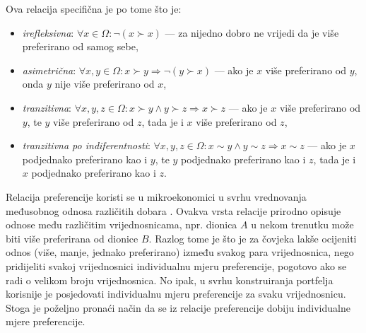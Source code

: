\documentclass[lmodern, utf8, diplomski, numeric]{fer}
\newcommand{\q}{\left}
\newcommand{\w}{\right}
\begin{document}
  Ova relacija specifična je po tome što je:
  \begin{itemize}
    \item \textit{irefleksivna}: $\forall x \in \Omega\colon \neg \q( x \succ x \w)$ --- za nijedno dobro ne vrijedi da je više preferirano od samog sebe,
    \item \textit{asimetrična}: $\forall x, y \in \Omega\colon x \succ y \Rightarrow \neg \q( y \succ x \w)$ --- ako je $x$ više preferirano od $y$, onda $y$ nije više preferirano od $x$,
    \item \textit{tranzitivna}: $\forall x, y, z \in \Omega\colon x \succ y \wedge y \succ z \Rightarrow x \succ z$ --- ako je $x$ više preferirano od $y$, te $y$ više preferirano od $z$, tada je i $x$ više preferirano od $z$,
    \item \textit{tranzitivna po indiferentnosti}: $\forall x, y, z \in \Omega\colon x \sim y \wedge y \sim z \Rightarrow x \sim z$ --- ako je $x$ podjednako preferirano kao i $y$, te $y$ podjednako preferirano kao i $z$, tada je i $x$ podjednako preferirano kao i $z$.
  \end{itemize}
  
  Relacija preferencije koristi se u mikroekonomici u svrhu vrednovanja međusobnog odnosa različitih dobara \citep{inzeko}.
  Ovakva vrsta relacije prirodno opisuje odnose među različitim vrijednosnicama, npr. dionica $A$ u nekom trenutku može biti više preferirana od dionice $B$.
  Razlog tome je što je za čovjeka lakše ocijeniti odnos (više, manje, jednako preferirano) između svakog para vrijednosnica, nego pridijeliti svakoj vrijednosnici individualnu mjeru preferencije, pogotovo ako se radi o velikom broju vrijednosnica.
  No ipak, u svrhu konstruiranja portfelja korisnije je posjedovati individualnu mjeru preferencije za svaku vrijednosnicu.
  Stoga je poželjno pronaći način da se iz relacije preferencije dobiju individualne mjere preferencije.
  
\end{document}
